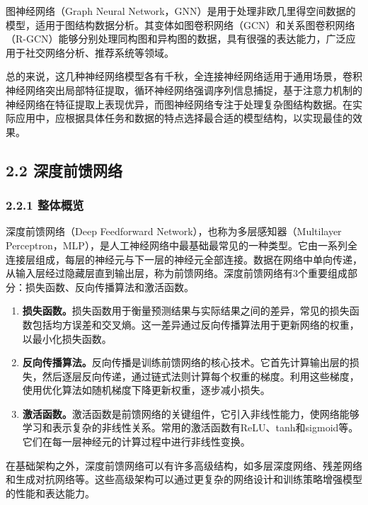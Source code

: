 图神经网络（Graph Neural
Network，GNN）是用于处理非欧几里得空间数据的模型，适用于图结构数据分析。其变体如图卷积网络（GCN）和关系图卷积网络（R-GCN）能够分别处理同构图和异构图的数据，具有很强的表达能力，广泛应用于社交网络分析、推荐系统等领域。

总的来说，这几种神经网络模型各有千秋，全连接神经网络适用于通用场景，卷积神经网络突出局部特征提取，循环神经网络强调序列信息捕捉，基于注意力机制的神经网络在特征提取上表现优异，而图神经网络专注于处理复杂图结构数据。在实际应用中，应根据具体任务和数据的特点选择最合适的模型结构，以实现最佳的效果。

\subsection{\texorpdfstring{\textbf{2.2
深度前馈网络}}{2.2 深度前馈网络}}\label{22-ux6df1ux5ea6ux524dux9988ux7f51ux7edc}

\subsubsection{\texorpdfstring{\textbf{2.2.1
整体概览}}{2.2.1 整体概览}}\label{221-ux6574ux4f53ux6982ux89c8}

深度前馈网络（Deep Feedforward Network），也称为多层感知器（Multilayer
Perceptron，MLP），是人工神经网络中最基础最常见的一种类型。它由一系列全连接层组成，每层的神经元与下一层的神经元全部连接。数据在网络中单向传递，从输入层经过隐藏层直到输出层，称为前馈网络。深度前馈网络有3个重要组成部分：损失函数、反向传播算法和激活函数。

\begin{enumerate}
\def\labelenumi{\arabic{enumi}.}
\item
  \textbf{损失函数。}损失函数用于衡量预测结果与实际结果之间的差异，常见的损失函数包括均方误差和交叉熵。这一差异通过反向传播算法用于更新网络的权重，以最小化损失函数。
\item
  \textbf{反向传播算法。}反向传播是训练前馈网络的核心技术。它首先计算输出层的损失，然后逐层反向传递，通过链式法则计算每个权重的梯度。利用这些梯度，使用优化算法如随机梯度下降更新权重，逐步减小损失。
\item
  \textbf{激活函数。}激活函数是前馈网络的关键组件，它引入非线性能力，使网络能够学习和表示复杂的非线性关系。常用的激活函数有ReLU、tanh和sigmoid等。它们在每一层神经元的计算过程中进行非线性变换。
\end{enumerate}

在基础架构之外，深度前馈网络可以有许多高级结构，如多层深度网络、残差网络和生成对抗网络等。这些高级架构可以通过更复杂的网络设计和训练策略增强模型的性能和表达能力。

